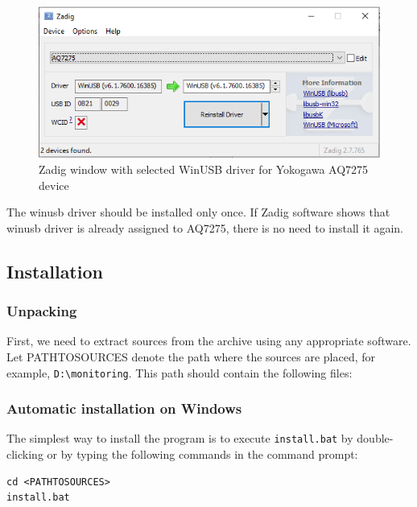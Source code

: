 \begin{figure}[h!]
	\begin{center}
		\includegraphics[width=12cm]{pictures/zadig.png}
	\end{center}
	\caption{Zadig window with selected WinUSB driver for Yokogawa AQ7275 device}
	\label{fig:ZadigWnd}
\end{figure}

The winusb driver should be installed only once. If Zadig software shows that winusb driver is already assigned to AQ7275, there is no need to install it again. 


\subsection{Installation}

\subsubsection{Unpacking}

First, we need to extract sources from the archive using any appropriate software. Let PATHTOSOURCES denote the path where the sources are placed, for example, \texttt{D:\textbackslash monitoring}. This path should contain the following files:

\subsubsection{Automatic installation on Windows}
The simplest way to install the program is to execute \texttt{install.bat} by double-clicking or by typing the following commands in the command prompt:
\begin{verbatim}
cd <PATHTOSOURCES>
install.bat
\end{verbatim}

